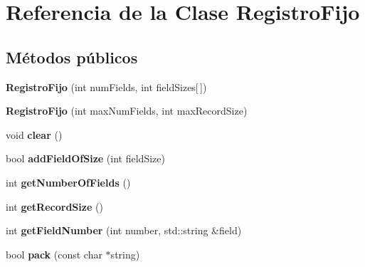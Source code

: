 \hypertarget{class_registro_fijo}{\section{\-Referencia de la \-Clase \-Registro\-Fijo}
\label{class_registro_fijo}
}
\subsection*{\-Métodos públicos}
\begin{DoxyCompactItemize}
\item 
\hypertarget{class_registro_fijo_a99d48dba6337ab04ea8ddd910f234021}{{\bfseries \-Registro\-Fijo} (int num\-Fields, int field\-Sizes\mbox{[}$\,$\mbox{]})}\label{class_registro_fijo_a99d48dba6337ab04ea8ddd910f234021}

\item 
\hypertarget{class_registro_fijo_a7cf848628a66c496ed3be1bbb612907e}{{\bfseries \-Registro\-Fijo} (int max\-Num\-Fields, int max\-Record\-Size)}\label{class_registro_fijo_a7cf848628a66c496ed3be1bbb612907e}

\item 
\hypertarget{class_registro_fijo_aceb547d717832021ff3d6a5a2a91524d}{void {\bfseries clear} ()}\label{class_registro_fijo_aceb547d717832021ff3d6a5a2a91524d}

\item 
\hypertarget{class_registro_fijo_a53b785105f2aadb50e2a72baf550efea}{bool {\bfseries add\-Field\-Of\-Size} (int field\-Size)}\label{class_registro_fijo_a53b785105f2aadb50e2a72baf550efea}

\item 
\hypertarget{class_registro_fijo_a4d51885bd384909d455a4ef36291f16f}{int {\bfseries get\-Number\-Of\-Fields} ()}\label{class_registro_fijo_a4d51885bd384909d455a4ef36291f16f}

\item 
\hypertarget{class_registro_fijo_aea889e52ab00b4e00939644c477b42a4}{int {\bfseries get\-Record\-Size} ()}\label{class_registro_fijo_aea889e52ab00b4e00939644c477b42a4}

\item 
\hypertarget{class_registro_fijo_a4cf3e7f16132c6d69c174553edab9d94}{int {\bfseries get\-Field\-Number} (int number, std\-::string \&field)}\label{class_registro_fijo_a4cf3e7f16132c6d69c174553edab9d94}

\item 
\hypertarget{class_registro_fijo_a5445ecc1dc2e81d883ca9ec57e5beef3}{bool {\bfseries pack} (const char $\ast$string)}\label{class_registro_fijo_a5445ecc1dc2e81d883ca9ec57e5beef3}


\end{DoxyCompactItemize}
